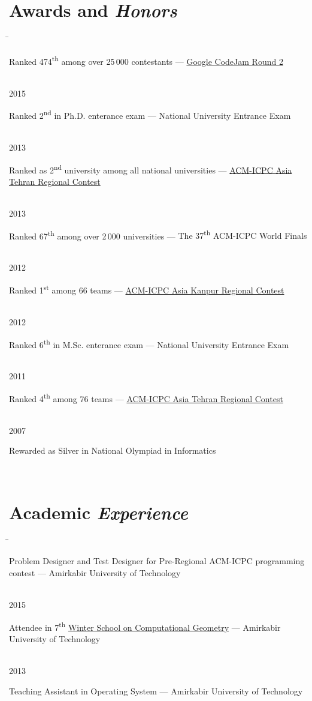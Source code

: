 \documentclass[a4paper,10pt]{article}
\newcommand{\supersc}[1]{\textsuperscript{#1}}
\newcommand{\follownote}[1]{--- {\footnotesize\color{darkblue}#1}}
\newcommand{\acmicpcnote}[2]{--- {\footnotesize\color{darkblue}
	\href{https://icpc.baylor.edu/regionals/finder/#1/standings}
	{#2}
}}
\newcommand{\codejamnote}[2]{--- {\footnotesize\color{darkblue}
	\href{https://codingcompetitions.withgoogle.com/codejam/round/#1}
	{#2}
}}
\begin{document}
\section*{{\color{orange}Awards and \emph{Honors}}}
\begin{tabbing}
\hspace{1.5cm}\= \>\parbox[t]{11.5cm}{
	Ranked 474\supersc{th} among over 25\,000 contestants
	\codejamnote{0000000000201900}{Google CodeJam Round 2}
} \\[2mm]
2015 \>\parbox[t]{11.5cm}{
	Ranked 2\supersc{nd} in Ph.D. enterance exam
	\follownote{National University Entrance Exam}
} \\[2mm]
2013 \>\parbox[t]{11.5cm}{
	Ranked as 2\supersc{nd} university among all
	national universities
	\acmicpcnote{Tehran-2013}
	{ACM-ICPC Asia Tehran Regional Contest}
} \\[2mm]
2013 \>\parbox[t]{11.5cm}{
	Ranked 67\supersc{th} among over 2\,000 universities
	\follownote{The 37\supersc{th} ACM-ICPC World Finals}
} \\[2mm]
2012 \>\parbox[t]{11.5cm}{
	Ranked 1\supersc{st} among 66 teams
	\acmicpcnote{Kanpur-2012}
	{ACM-ICPC Asia Kanpur Regional Contest}
} \\[2mm]
2012 \>\parbox[t]{11.5cm}{
	Ranked 6\supersc{th} in M.Sc. enterance exam
	\follownote{National University Entrance Exam}
} \\[2mm]
2011 \>\parbox[t]{11.5cm}{
	Ranked 4\supersc{th} among 76 teams 
	\acmicpcnote{Tehran-2011}
	{ACM-ICPC Asia Tehran Regional Contest}
} \\[2mm]
2007 \>\parbox[t]{11.5cm}{
	Rewarded as Silver in National Olympiad in Informatics
} \\[2mm]
\end{tabbing}

\section*{{\color{green}Academic \emph{Experience}}}
\begin{tabbing}
\hspace{1.5cm}\= \>\parbox[t]{11.5cm}{
	Problem Designer and Test Designer for Pre-Regional ACM-ICPC
	programming contest
	\follownote{Amirkabir University of Technology}
} \\[2mm]
2015 \>\parbox[t]{11.5cm}{
	Attendee in 7\supersc{th} \href{http://wscg.aut.ac.ir}
	{Winter School on Computational Geometry}
	\follownote{Amirkabir University of Technology}
} \\[2mm]
2013 \>\parbox[t]{11.5cm}{
	Teaching Assistant in Operating System
	\follownote{Amirkabir University of Technology}
} \\[2mm]
\end{tabbing}
\end{document}
